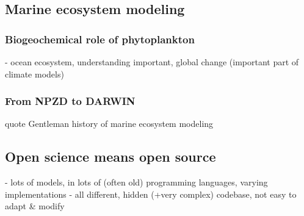 \documentclass[journal abbreviations, manuscript]{copernicus}
\begin{document}
\begin{abstract} [Just collecting ideas:] 
phydra is an open-source object-oriented python package for modeling marine ecosystems, based on the xarray-simlab framework, with the goal to support efficient, open and easily reproducible model development. 

The library provides pre-built model components that can be used to assemble complex marine ecosystem models. All basic processes can be adapted and modified using python to describe different and more complex ecosystems. 

By being embedded within the xarray-simlab framework, phydra benefits from compatibilities with other scientific python packages, such as dask for parallel computing, xarray and zarr for handling large datasets, and further plotting and data analysis functionalities. 

Here, we demonstrate the usage of the phydra v1 package in a simple NPZD setting and to showcase the flexibility, in a more complex size based trophic structure model. Both in slab physics.
//
The utility of the phydra package is here shown via three model implementations. Two models from literature are recreated, and the flexible nature of this package allows a combination of as a third example. 
\end{abstract}








\introduction  %

\subsection{Marine ecosystem modeling}

\subsubsection{Biogeochemical role of phytoplankton}
- ocean ecosystem, understanding important, global change (important part of climate models)

\subsubsection{From NPZD to DARWIN}
quote Gentleman history of marine ecosystem modeling


\subsection{Open science means open source}
- lots of models, in lots of (often old) programming languages, varying implementations
- all different, hidden (+very complex) codebase, not easy to adapt & modify
\end{document}
